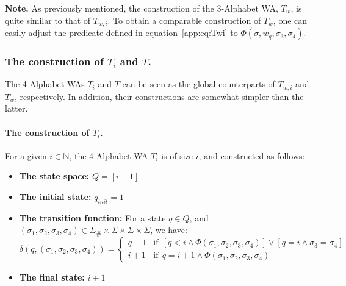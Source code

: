\textbf{Note.} As previously mentioned, the construction of the 3-Alphabet WA, $T_{w}$, is quite similar to that of $T_{w,i}$. To obtain a comparable construction of $T_{w}$, one can easily adjust the predicate defined in equation~\ref{app:eq:Twi} to $\Phi(\sigma, w_{q}, \sigma_{3}, \sigma_{4})$.

\subsubsection{The construction of $T_{i}$ and $T$.} 
The 4-Alphabet WAs $T_{i}$ and $T$ can be seen as the global counterparts of $T_{w,i}$ and $T_{w}$, respectively. In addition, their constructions are somewhat simpler than the latter.

\paragraph{The construction of $T_{i}$.} For a given $i \in \mathbb{N}$, the 4-Alphabet WA $T_{i}$ is of size $i$, and constructed as follows: 
\begin{itemize}
     \item \textbf{The state space:} $Q = [i+1]$
    \item \textbf{The initial state:} $q_{init} = 1$
    \item \textbf{The transition function:} For a state $q \in Q$, and $(\sigma_{1}, \sigma_{2}, \sigma_{3}, \sigma_{4}) \in \Sigma_{\#} \times \Sigma \times \Sigma \times \Sigma$, we have:
   $$\delta(q, (\sigma_{1}, \sigma_{2}, \sigma_{3}, \sigma_{4})) = 
   \begin{cases}
       q+1 & \text{if} ~~ [q < i \land \Phi(\sigma_{1}, \sigma_{2}, \sigma_{3}, \sigma_{4})] \lor [q=i \land \sigma_{3} = \sigma_{4}] \\
        i+1 &  \text{if} ~~ q = i+1 \land \Phi(\sigma_{1}, \sigma_{2}, \sigma_{3}, \sigma_{4})
   \end{cases}
   $$
   \item \textbf{The final state:} $i+1$
\end{itemize}


